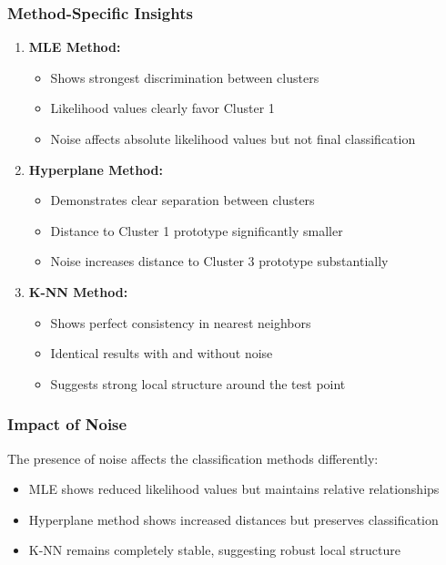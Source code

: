 \documentclass[12pt]{article}
\begin{document}
\subsubsection{Method-Specific Insights}
\begin{enumerate}
    \item \textbf{MLE Method:}
    \begin{itemize}
        \item Shows strongest discrimination between clusters
        \item Likelihood values clearly favor Cluster 1
        \item Noise affects absolute likelihood values but not final classification
    \end{itemize}
    
    \item \textbf{Hyperplane Method:}
    \begin{itemize}
        \item Demonstrates clear separation between clusters
        \item Distance to Cluster 1 prototype significantly smaller
        \item Noise increases distance to Cluster 3 prototype substantially
    \end{itemize}
    
    \item \textbf{K-NN Method:}
    \begin{itemize}
        \item Shows perfect consistency in nearest neighbors
        \item Identical results with and without noise
        \item Suggests strong local structure around the test point
    \end{itemize}
\end{enumerate}

\subsubsection{Impact of Noise}
The presence of noise affects the classification methods differently:
\begin{itemize}
    \item MLE shows reduced likelihood values but maintains relative relationships
    \item Hyperplane method shows increased distances but preserves classification
    \item K-NN remains completely stable, suggesting robust local structure
\end{itemize}
\end{document}
